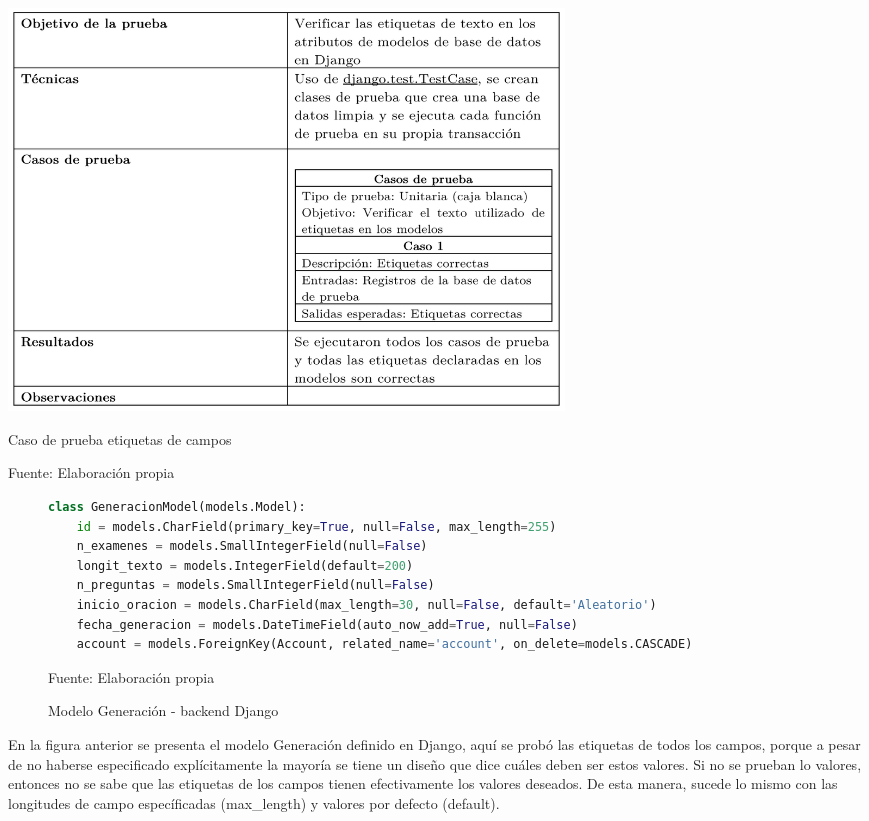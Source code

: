 \documentclass[../Main.tex]{subfiles}
\begin{document}
    \begin{table}[H]
	\begin{Center}
		\includegraphics[width=5.8in,height=4.2in]{Chapters/06ChapterPruebas/images/caso_prueba_django.png}
	    \caption{Caso de prueba etiquetas de campos}
	    Fuente: Elaboración propia
        \label{tab:table1}
	\end{Center}
    \end{table}

       \begin{figure}[H]
	\begin{Center}
       \begin{lstlisting}[language=Python]
class GeneracionModel(models.Model):
    id = models.CharField(primary_key=True, null=False, max_length=255)
    n_examenes = models.SmallIntegerField(null=False)
    longit_texto = models.IntegerField(default=200)
    n_preguntas = models.SmallIntegerField(null=False)
    inicio_oracion = models.CharField(max_length=30, null=False, default='Aleatorio')
    fecha_generacion = models.DateTimeField(auto_now_add=True, null=False)
    account = models.ForeignKey(Account, related_name='account', on_delete=models.CASCADE)\end{lstlisting}
	    \caption{Modelo Generación - backend Django}
	    Fuente: Elaboración propia
        \label{fig:section}
	\end{Center}
    \end{figure}
    
    En la figura anterior se presenta el modelo Generación definido en Django, aquí se probó las etiquetas de todos los campos, porque a pesar de no haberse especificado explícitamente la mayoría se tiene un diseño que dice cuáles deben ser estos valores. Si no se prueban lo valores, entonces no se sabe que las etiquetas de los campos tienen efectivamente los valores deseados. De esta manera, sucede lo mismo con las longitudes de campo específicadas (max\_length) y valores por defecto (default).
    
\end{document}
